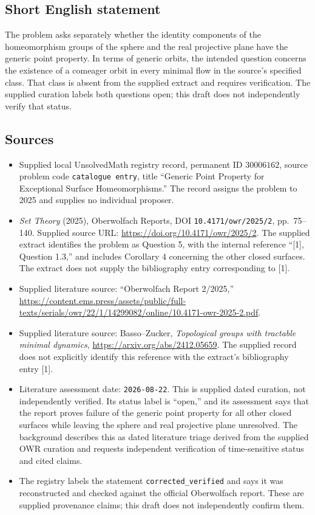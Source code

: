 \documentclass[11pt]{article}
\begin{document}
\subsection{Short English statement}
The problem asks separately whether the identity components of the homeomorphism groups of the sphere and the real projective plane have the generic point property. In terms of generic orbits, the intended question concerns the existence of a comeager orbit in every minimal flow in the source's specified class. That class is absent from the supplied extract and requires verification. The supplied curation labels both questions open; this draft does not independently verify that status.
\subsection{Sources}
\begin{itemize}
\item Supplied local UnsolvedMath registry record, permanent ID \(30006162\), source problem code \texttt{catalogue entry}, title ``Generic Point Property for Exceptional Surface Homeomorphisms.'' The record assigns the problem to 2025 and supplies no individual proposer.
\item \emph{Set Theory} (2025), Oberwolfach Reports, DOI \texttt{10.4171/owr/2025/2}, pp.\ 75--140. Supplied source URL: \url{https://doi.org/10.4171/owr/2025/2}. The supplied extract identifies the problem as Question 5, with the internal reference ``[1], Question 1.3,'' and includes Corollary 4 concerning the other closed surfaces. The extract does not supply the bibliography entry corresponding to [1].
\item Supplied literature source: ``Oberwolfach Report 2/2025,'' \url{https://content.ems.press/assets/public/full-texts/serials/owr/22/1/14299082/online/10.4171-owr-2025-2.pdf}.
\item Supplied literature source: Basso--Zucker, \emph{Topological groups with tractable minimal dynamics}, \url{https://arxiv.org/abs/2412.05659}. The supplied record does not explicitly identify this reference with the extract's bibliography entry [1].
\item Literature assessment date: \texttt{2026-08-22}. This is supplied dated curation, not independently verified. Its status label is ``open,'' and its assessment says that the report proves failure of the generic point property for all other closed surfaces while leaving the sphere and real projective plane unresolved. The background describes this as dated literature triage derived from the supplied OWR curation and requests independent verification of time-sensitive status and cited claims.
\item The registry labels the statement \texttt{corrected\_verified} and says it was reconstructed and checked against the official Oberwolfach report. These are supplied provenance claims; this draft does not independently confirm them.
\end{itemize}
\end{document}
